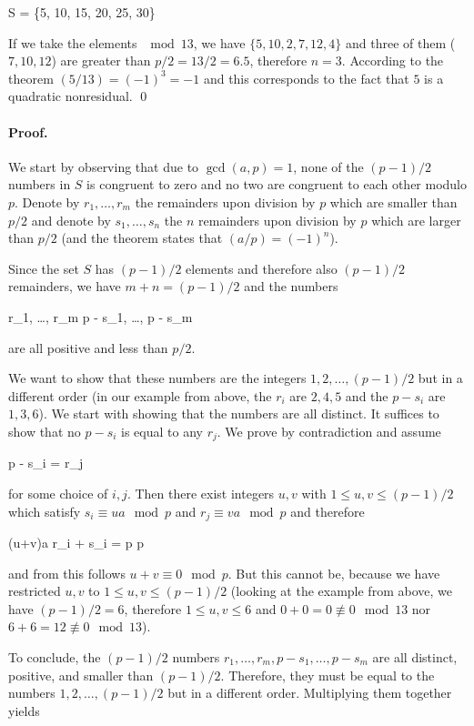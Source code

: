 \bee
S = \{5, 10, 15, 20, 25, 30\}
\eee

If we take the elements $\mod 13$, we have $\{5, 10, 2, 7, 12, 4\}$ and three of them ($7, 10, 12$) are greater than $p/2 = 13/2=6.5$, therefore $n=3$. According to the theorem $(5/13) = (-1)^3 = -1$ and this corresponds to the fact that $5$ is a quadratic nonresidual. \qed

\paragraph{Proof.} We start by observing that due to $\gcd(a,p)=1$, none of the $(p-1)/2$ numbers in $S$ is congruent to zero
and no two are congruent to each other modulo $p$. Denote by $r_1, \ldots, r_m$ the remainders upon division by $p$ which are smaller than $p/2$ and denote by $s_1, \ldots, s_n$ the $n$ remainders upon division by $p$ which are larger than $p/2$ (and the theorem states that $(a/p) = (-1)^n$). 

Since the set $S$ has $(p-1)/2$ elements and therefore also $(p-1)/2$ remainders, we have $m + n = (p-1)/2$ and the numbers

\bee
r_1, \ldots, r_m \quad {} \quad p - s_1, \ldots, p - s_m
\eee

are all positive and less than $p/2$.

We want to show that these numbers are the integers $1, 2, \ldots, (p-1)/2$ but in a different order (in our example from above, the $r_i$ are $2, 4, 5$ and the $p - s_i$ are $1, 3, 6$). We start with showing that the numbers are all distinct. It suffices to show that no $p - s_i$ is equal to any $r_j$. We prove by contradiction and assume 

\bee
p - s_i = r_j
\eee

for some choice of $i, j$. Then there exist integers $u, v$ with $1 \leq u, v \leq (p-1)/2$ which satisfy $s_i \equiv u a \mod p$ and $r_j \equiv v a \mod p$ and therefore

\bee
(u+v)a \equiv r_i + s_i = p  \mod p
\eee

and from this follows $u + v \equiv 0 \mod p$. But this cannot be, because we have restricted $u, v$ to $1 \leq u, v \leq (p-1)/2$ (looking at the example from above, we have $(p-1)/2 = 6$, therefore $1 \leq u,v \leq 6$ and $0 + 0 = 0 \not\equiv 0 \mod 13$ nor $6 + 6 = 12 \not\equiv 0 \mod 13$).


To conclude, the $(p-1)/2$ numbers $r_1, \ldots, r_m, p - s_1, \ldots, p - s_m$ are all distinct, positive, and smaller than $(p-1)/2$. Therefore, they must be equal to the numbers $1, 2, \ldots, (p-1)/2$ but in a different order. Multiplying them together yields

